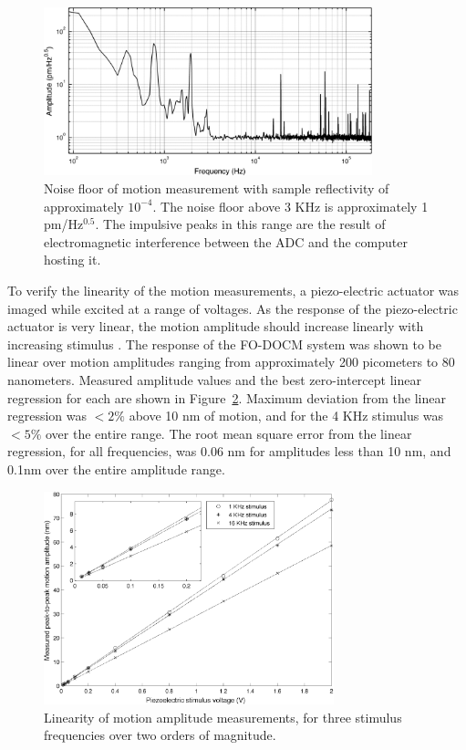 \begin{figure}[h!]
\centering
\includegraphics[width=0.85\textwidth]{Images/Results/noise_floor_2_big.png}
\caption[Noise floor of motion measurement.]{Noise floor of motion measurement with sample reflectivity of approximately $10^{-4}$. The noise floor above 3 KHz is approximately 1 pm/Hz$^{0.5}$. The impulsive peaks in this range are the result of electromagnetic interference between the ADC and the computer hosting it. \label{fig:noise_floor2}}
\end{figure}

To verify the linearity of the motion measurements, a piezo-electric actuator was imaged while excited at a range of voltages. As the response of the piezo-electric actuator is very linear, the motion amplitude should increase linearly with increasing stimulus \cite{klaassen}. The response of the FO-DOCM system was shown to be linear over motion amplitudes ranging from approximately 200 picometers to 80 nanometers. Measured amplitude values and the best zero-intercept linear regression for each are shown in Figure~\ref{fig:motion_linearity}. Maximum deviation from the linear regression was $<2\%$ above 10 nm of motion, and for the 4 KHz stimulus was $<5\%$ over the entire range. The root mean square error from the linear regression, for all frequencies, was 0.06 nm for amplitudes less than 10 nm, and 0.1nm over the entire amplitude range.

\begin{figure}[h!]
\centering
\includegraphics[width=0.75\textwidth]{Images/Results/motion_linearity.png}
\caption[Linearity of motion amplitude measurements]{Linearity of motion amplitude measurements, for three stimulus frequencies over two orders of magnitude.\label{fig:motion_linearity}}
\end{figure}

